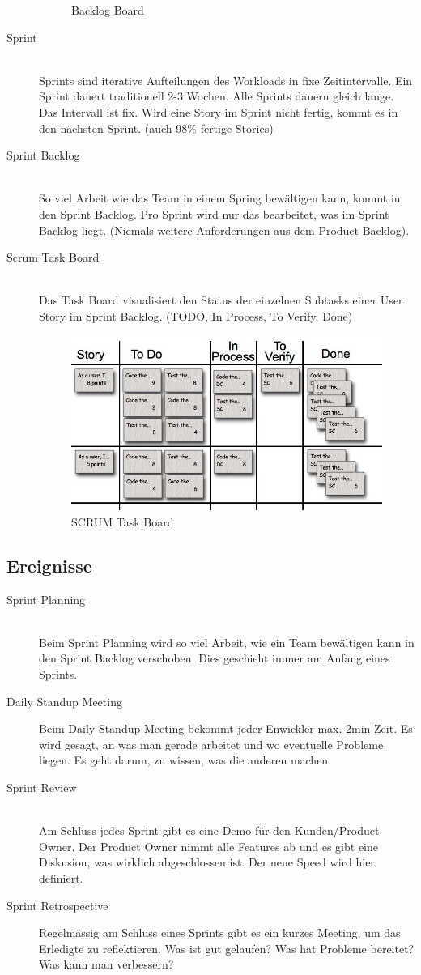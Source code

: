 \begin{description}
\begin{figure}[h!]
		\caption{Backlog Board}
		\label{fig:productbacklog}
	\end{figure}
	\item[Sprint] \hfill \\
	Sprints sind iterative Aufteilungen des Workloads in fixe Zeitintervalle. Ein Sprint dauert traditionell 2-3 Wochen. Alle Sprints dauern gleich lange. Das Intervall ist fix. Wird eine Story im Sprint nicht fertig, kommt es in den nächsten Sprint. (auch 98\% fertige Stories)
	\item[Sprint Backlog] \hfill \\
	So viel Arbeit wie das Team in einem Spring bewältigen kann, kommt in den Sprint Backlog. Pro Sprint wird nur das bearbeitet, was im Sprint Backlog liegt. (Niemals weitere Anforderungen aus dem Product Backlog).
	\item[Scrum Task Board] \hfill \\
	Das Task Board visualisiert den Status der einzelnen Subtasks einer User Story im Sprint Backlog. (TODO, In Process, To Verify, Done)
	\begin{figure}[h!]
		\centering
		\includegraphics[width=0.6\linewidth]{images/scrum_task_board}
		\caption{SCRUM Task Board}
		\label{fig:scrumtaskboard}
	\end{figure}
\end{description}

\subsection{Ereignisse}
\begin{description}
	\item[Sprint Planning] \hfill \\
	Beim Sprint Planning wird so viel Arbeit, wie ein Team bewältigen kann in den Sprint Backlog verschoben. Dies geschieht immer am Anfang eines Sprints.
	\item[Daily Standup Meeting] Beim Daily Standup Meeting bekommt jeder Enwickler max. 2min Zeit. Es wird gesagt, an was man gerade arbeitet und wo eventuelle Probleme liegen. Es geht darum, zu wissen, was die anderen machen.
	\item[Sprint Review] \hfill \\
	Am Schluss jedes Sprint gibt es eine Demo für den Kunden/Product Owner. Der Product Owner nimmt alle Features ab und es gibt eine Diskusion, was wirklich abgeschlossen ist. Der neue Speed wird hier definiert. 
	\item[Sprint Retrospective]
	Regelmässig am Schluss eines Sprints gibt es ein kurzes Meeting, um das Erledigte zu reflektieren. Was ist gut gelaufen? Was hat Probleme bereitet? Was kann man verbessern?
\end{description}

